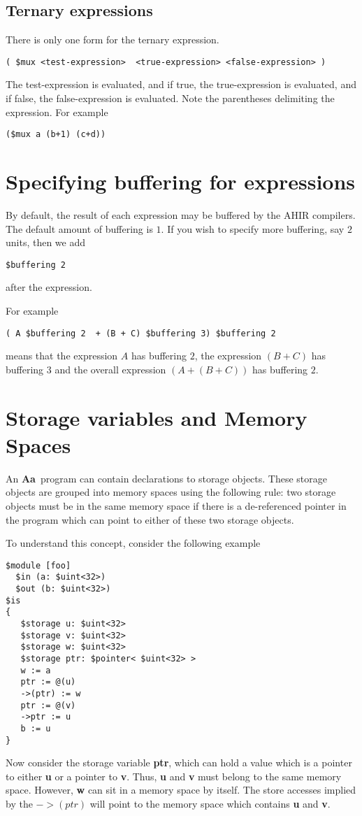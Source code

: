 \documentclass{article}
\newcommand{\Aa}{{\bf Aa}~}
\begin{document}
\subsection{Ternary expressions}

There is only one
form for the ternary expression.
\begin{verbatim}
( $mux <test-expression>  <true-expression> <false-expression> )
\end{verbatim}%
The test-expression is evaluated, and if true, the true-expression
is evaluated, and if false, the false-expression is evaluated.
Note the parentheses delimiting the expression.
For example
\begin{verbatim}
($mux a (b+1) (c+d))
\end{verbatim}


\section{Specifying buffering for expressions}

By default, the result of each expression may be
buffered by the AHIR compilers.  The default amount of
buffering is $1$.  If you wish to specify more buffering, 
say $2$ units, then we add 
\begin{verbatim}
$buffering 2
\end{verbatim}
after the expression.

For example
\begin{verbatim}
( A $buffering 2  + (B + C) $buffering 3) $buffering 2
\end{verbatim}
means that the expression $A$ has buffering $2$,
the expression $(B+C)$ has buffering $3$ and the
overall expression $(A + (B+C))$ has buffering $2$.

\section{Storage variables and Memory Spaces}

An \Aa program can contain declarations to storage objects.  These
storage objects are grouped into memory spaces using
the following rule: two storage objects must be in the same
memory space if there is a de-referenced pointer in the
program which can point to either of these two storage objects.

To understand this concept, consider the following
example
\begin{verbatim}
$module [foo] 
  $in (a: $uint<32>)
  $out (b: $uint<32>) 
$is
{
   $storage u: $uint<32>
   $storage v: $uint<32>
   $storage w: $uint<32>
   $storage ptr: $pointer< $uint<32> >
   w := a
   ptr := @(u)
   ->(ptr) := w
   ptr := @(v)
   ->ptr := u
   b := u
}
\end{verbatim}
Now consider the storage variable {\bf ptr}, which can hold a value which
is a pointer to either {\bf u} or a pointer to {\bf v}.  Thus,
{\bf u} and {\bf v} must belong to the same memory space.
However, {\bf w} can sit in a memory space by itself.  The
store accesses implied by the $->(ptr)$ will point to the
memory space which contains {\bf u} and {\bf v}.
\end{document}
